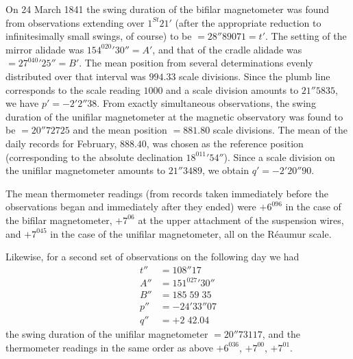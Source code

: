 On 24 March 1841 the swing duration of the bifilar magnetometer was found from observations extending over $1^{St}21'$ (after the appropriate reduction to infinitesimally small swings, of course) to be $=28''89071=t'$. The setting of the mirror alidade was $154^020'30''=A'$, and that of the cradle alidade was $=27^040'25''=B'$. The mean position from several determinations evenly distributed over that interval was $994.33$ scale divisions. Since the plumb line corresponds to the scale reading $1000$ and a scale division amounts to $21''5835$, we have $p'=-2'2''38$. From exactly simultaneous observations, the swing duration of the unifilar magnetometer at the magnetic
observatory was found to be $=20''72725$ and the mean position $=881.80$ scale divisions. The mean of the daily records for February, $888.40$, was chosen as the reference position (corresponding to the absolute declination $18^011'54''$). Since a scale division on the unifilar magnetometer amounts to $21''3489$, we obtain $q'=-2'20''90$.

The mean thermometer readings (from records taken immediately before the observations began and immediately after they ended) were $+6^096$ in the case of the bifilar magnetometer, $+7^06$ at the upper attachment of the suspension wires, and $+7^045$ in the case of the unifilar magnetometer, all on the Réaumur scale.

Likewise, for a second set of observations on the following day we had
\[
\begin{aligned}
t''&=108''17\\
A''&=151^027'30''\\
B''&=185\;59\;35\\
p''&=-24'33''07\\
q''&=+2\;42.04
\end{aligned}
\]
the swing duration of the unifilar magnetometer $=20''73117$, and the thermometer readings in the same order as above $+6^036$, $+7^00$, $+7^01$.


